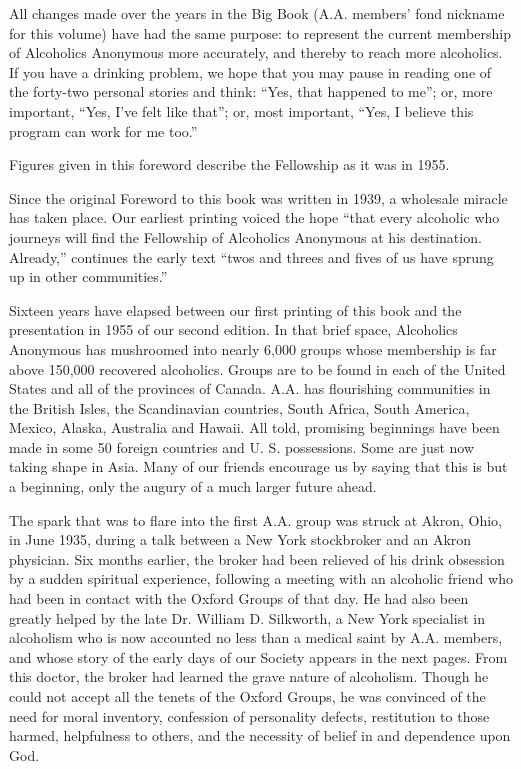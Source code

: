 \begin{biblechapter}
\verse All changes made over the years in the Big Book 
    (A.A. members’ fond nickname for this volume) 
    have had the same purpose: 
    to represent the current membership of Alcoholics Anonymous more accurately, and thereby to reach more alcoholics.
\verse If you have a drinking problem, 
    we hope that you may pause in reading one of the forty-two personal stories and think: 
    “Yes, that happened to me”; 
    or, more important, “Yes, I’ve felt like that”; 
    or, most important, “Yes, I believe this program can work for me too.”
\end{biblechapter}



\begin{biblechapter}
    Figures given in this foreword describe the
\verse Fellowship as it was in 1955.

\verse Since the original Foreword to this book was written in 1939, 
    a wholesale miracle has taken place. 
\verse Our earliest printing voiced the hope 
    “that every alcoholic who journeys will find the Fellowship of Alcoholics Anonymous at his destination. Already,”
    continues the early text “twos and threes and fives of us have sprung up in other communities.”

\verse Sixteen years have elapsed between our first printing of this book and the presentation in 1955 of our second edition.
\verse In that brief space, Alcoholics Anonymous has mushroomed into nearly 6,000 groups 
    whose membership is far above 150,000 recovered alcoholics.
\verse Groups are to be found in each of the United States 
    and all of the provinces of Canada.
\verse A.A. has flourishing communities in the British Isles, 
    the Scandinavian countries, South Africa, South America, Mexico, Alaska, Australia and Hawaii. 
\verse All told, promising beginnings have been made in some 50 foreign countries and U. S. possessions. 
\verse Some are just now taking shape in Asia. 
\verse Many of our friends encourage us by saying that this is but a beginning, 
    only the augury of a much larger future ahead.

\verse The spark that was to flare into the first A.A. group was struck at Akron, Ohio, in June 1935, 
    during a talk between a New York stockbroker and an Akron physician. 
\verse Six months earlier, the broker had been relieved of his drink obsession by a sudden spiritual experience, 
    following a meeting with an alcoholic friend who had been in contact with the Oxford Groups of that day. 
\verse He had also been greatly helped by the late Dr. William D. Silkworth, 
    a New York specialist in alcoholism who is now accounted no less than a medical saint by A.A. members, 
    and whose story of the early days of our Society appears in the next pages. 
\verse From this doctor, the broker had learned the grave nature of alcoholism. 
\verse Though he could not accept all the tenets of the Oxford Groups, 
    he was convinced of the need for moral inventory, 
    confession of personality defects, 
    restitution to those harmed, 
    helpfulness to others, 
    and the necessity of belief in and dependence upon God.


\end{biblechapter}
